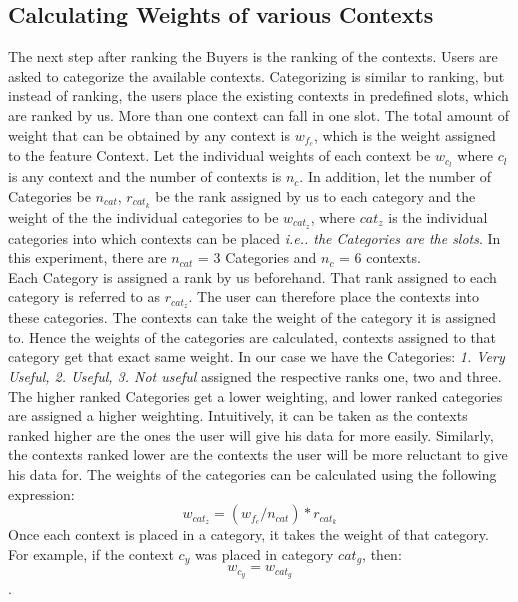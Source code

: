 \subsection{Calculating Weights of various Contexts}
The next step after ranking the Buyers is the ranking of the contexts. Users are asked to categorize the available contexts. Categorizing is similar to ranking, but instead of ranking, the users
place the existing contexts in predefined slots, which are ranked by us. More than one context can fall in one slot. The total amount of weight that can be 
obtained by any context is $w_{f_{c}}$, which is the weight assigned to the feature Context. Let the individual weights of each context be $w_{c_{l}}$ where $c_l$ is any context and the number of contexts is $n_c$. In addition, let the number of Categories be $n_{cat}$, $r_{cat_{k}}$ be the rank assigned by us to
each category and the weight
of the the individual categories to be $w_{cat_{z}}$, where $cat_z$ is the individual categories into which contexts can be placed {\it i.e.. the Categories are the slots}. In this experiment, there are $n_{cat}$ = 3 Categories
and $n_c$ = 6 contexts.\\
Each Category is assigned a rank by us beforehand. That rank assigned to each category is referred to as $r_{cat_{z}}$. The user can therefore place the contexts into these categories. The contexts can take the weight of the
category it is assigned to.
Hence the weights of the categories are calculated, contexts assigned to that category get that exact same weight. In our case we have the Categories: {\it 1. Very Useful, 2. Useful, 3. Not useful} assigned the respective ranks one, two and three.
The higher ranked Categories get a lower weighting, and lower ranked categories are assigned a higher weighting. Intuitively, it can be taken as the contexts ranked higher are the ones the user will give his data for
more easily. Similarly, the contexts ranked lower are the contexts the user will be more reluctant to give his data for. The weights of the categories can be calculated using the following expression:
$$w_{cat_{z}} = (w_{f_{c}}/n_{cat})*r_{cat_{k}}$$
Once each context is placed in a category, it takes the weight of that category. For example, if the context $c_y$ was placed in category $cat_g$, then:
$$w_{c_{y}} = w_{cat_{g}}$$.

